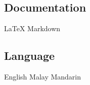 \documentclass[letterpaper]{deedy-resume} %
\begin{document}
\newpage %

\begin{minipage}[t]{0.33\textwidth} %
\subsection{Documentation}
\LaTeX{} \textbullet{} Markdown \\

\sectionspace

\subsection{Language}
English \textbullet{} Malay \textbullet{} Mandarin
%
\sectionspace
\end{minipage} %
\hfill
\end{document}
